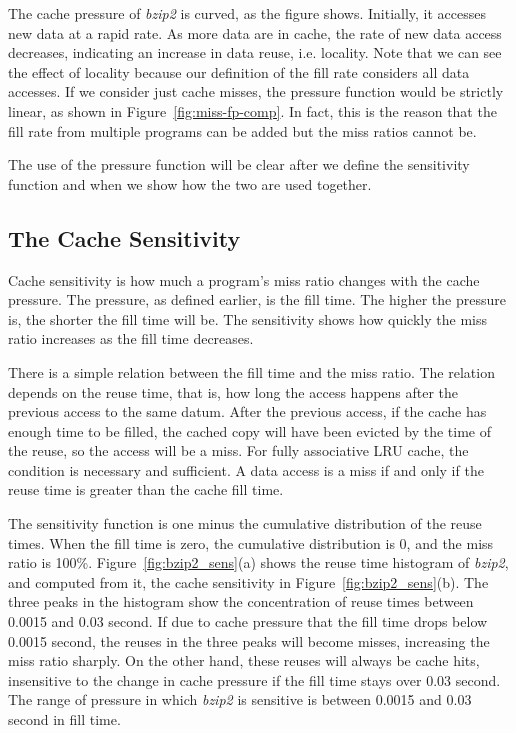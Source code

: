 The cache pressure of \emph{bzip2} is curved, as the figure shows.
Initially, it accesses new data at a rapid rate.  As more data are in
cache, the rate of new data access decreases, indicating an increase
in data reuse, i.e. locality.  Note that we can see the effect
of locality because our definition of the fill rate considers all data
accesses.  If we consider just cache misses, the pressure function
would be strictly linear, as shown in Figure~\ref{fig:miss-fp-comp}.
In fact, this is the reason that the fill rate from multiple programs
can be added but the miss ratios cannot be. 

The use of the pressure function will be clear after we define the
sensitivity function and when we show how the two are used together.

\subsection{The Cache Sensitivity}

Cache sensitivity is how much a program's miss ratio changes with the
cache pressure.  The pressure, as defined earlier, is the fill time.
The higher the pressure is, the shorter the fill time will be.  The
sensitivity shows how quickly the miss ratio increases as the fill time
decreases.

There is a simple relation between the fill time and the miss ratio.
The relation depends on the reuse time, that is, how long the access
happens after the previous access to the same datum.  After the
previous access, if the cache has enough time to be filled, the cached
copy will have been evicted by the time of the reuse, so the access
will be a miss.  For fully associative LRU cache, the condition is
necessary and sufficient.  A data access is a miss if and only if the
reuse time is greater than the cache fill time.

The sensitivity function is one minus the cumulative distribution of
the reuse times.  When the fill time is zero, the cumulative
distribution is 0, and the miss ratio is 100\%.
Figure~\ref{fig:bzip2_sens}(a) shows the reuse time histogram of
\emph{bzip2}, and computed from it, the cache sensitivity in
Figure~\ref{fig:bzip2_sens}(b).  The three peaks in the histogram show the
concentration of reuse times between 0.0015 and 0.03 second.  If due to
cache pressure that the fill time drops below 0.0015 second, the reuses
in the three peaks will become misses, increasing the miss ratio
sharply.  On the other hand, these reuses will always be cache hits,
insensitive to the change in cache pressure if the fill time stays
over 0.03 second.  The range of pressure in which
\emph{bzip2} is sensitive is between 0.0015 and 0.03 second in fill time.


